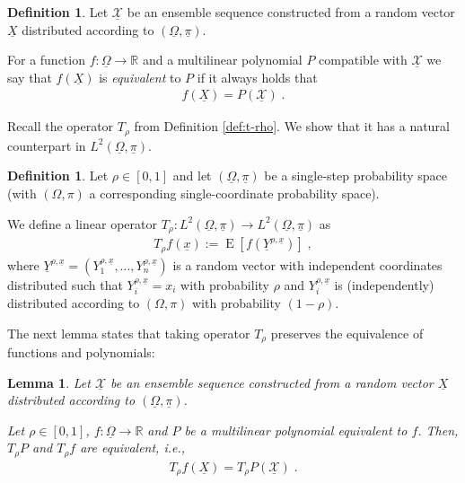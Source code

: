 \documentclass{daj}
\newcommand{\1}{\mathbbm{1}}
\theoremstyle{plain}
\newtheorem{lemma}[theorem]{Lemma}
\theoremstyle{definition}
\newtheorem{definition}[theorem]{Definition}
\DeclareMathOperator*{\EE}{E}
\begin{document}
\begin{definition}
Let $\underline{\mathcal{X}}$ be an ensemble sequence constructed from a 
random vector $\underline{X}$ distributed according to 
$(\underline{\Omega}, \underline{\pi})$.

For a function $f: \underline{\Omega} \to \mathbb{R}$
and a multilinear polynomial $P$ compatible with
$\underline{\mathcal{X}}$
we say that $f(\underline{X})$
is \emph{equivalent} to $P$ if it always holds that
\begin{align*}
  f(\underline{X}) = P(\underline{\mathcal{X}}) \; .
\end{align*}
\end{definition}

\medskip

Recall the operator $T_\rho$ from Definition \ref{def:t-rho}.
We show that it has a natural counterpart in 
$L^2({\underline{\Omega}}, \underline{\pi})$.
\begin{definition}
\label{def:t-rho-function}
Let $\rho \in [0, 1]$ and let
$({\underline{\Omega}}, \underline{\pi})$
be a single-step probability space (with
$({\Omega}, \pi)$ a corresponding 
single-coordinate probability space). 

We define a linear operator 
$T_\rho:  L^2({\underline{\Omega}}, \underline{\pi}) \to 
	L^2({\underline{\Omega}}, \underline{\pi})$ as
\begin{align*}
	T_\rho f({\underline{x}}) := \EE \left[ f\left( 
  {\underline{Y}}^{\rho, {\underline{x}}} \right) \right] \; ,
\end{align*}
where ${\underline{Y}}^{\rho, {\underline{x}}} = 
({Y}^{\rho, {\underline{x}}}_1, \ldots, 
{Y}^{\rho, {\underline{x}}}_n)$ 
is a random vector with independent coordinates
distributed such that ${Y}^{\rho, {\underline{x}}}_i = 
{x}_i$ 
with probability $\rho$ 
and ${Y}^{\rho, {\underline{x}}}_i$ is 
(independently)
distributed according to $({\Omega}, \pi)$ with probability 
$(1-\rho)$.
\end{definition}

The next lemma states that taking operator $T_\rho$ preserves
the equivalence of functions and polynomials:
\begin{lemma}
Let $\underline{\mathcal{X}}$ be an ensemble sequence constructed from
a random vector ${\underline{X}}$ distributed according
to $({\underline{\Omega}}, \underline{\pi})$.

Let $\rho \in [0, 1]$, $f: {\underline{\Omega}} \to \mathbb{R}$
and $P$ be a multilinear polynomial equivalent to $f$.
Then, $T_\rho P$ and $T_\rho f$ are equivalent, i.e.,
\begin{align*}
  T_\rho f ({\underline{X}})
  = T_\rho P (\underline{\mathcal{X}}) \; .
\end{align*}
\end{lemma}
\end{document}
